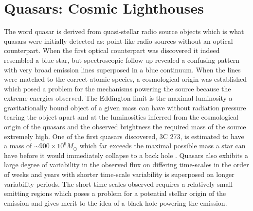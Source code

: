 \clearpage




\section{Quasars: Cosmic Lighthouses}
\label{sec:intro:qso}

The word quasar is derived from quasi-stellar radio source objects which is what
quasars were initially detected as: point-like radio sources without an optical
counterpart. When the first optical counterpart was discovered it indeed
resembled a blue star, but spectroscopic follow-up revealed a confusing pattern
with very broad emission lines superposed in a blue continuum. When the lines
were matched to the correct atomic species, a cosmological origin was
established which posed a problem for the mechanisms powering the source because
the extreme energies observed. The Eddington limit is the maximal luminosity a
gravitationally bound object of a given mass can have without radiation pressure
tearing the object apart and at the luminosities inferred from the cosmological
origin of the quasars and the observed brightness the required mass of the
source extremely high. One of the first quasars discovered, 3C 273, is estimated
to have a mass of $\sim900 \times 10^{6} M_\odot$ \citep{Peterson2004} which far
exceeds the maximal possible mass a star can have before it would immediately
collapse to a back hole \citep{Belczynski2010}. Quasars also exhibits a large
degree of variability in the observed flux on differing time-scales in the order
of weeks and years with shorter time-scale variability is superposed on longer
variability periods. The short time-scales observed requires a relatively small
emitting regions which poses a problem for a potential stellar origin of the
emission and gives merit to the idea of a black hole powering the emission.

